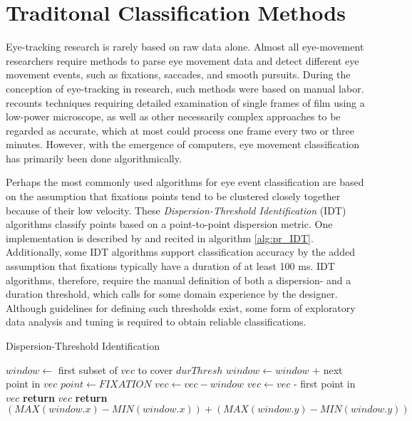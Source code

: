\section{Traditonal Classification Methods} \label{sec:pr_TraditionalClassificationMethods}

Eye-tracking research is rarely based on raw data alone. Almost all eye-movement researchers require methods to parse eye movement data and detect different eye movement events, such as fixations, saccades, and smooth pursuits. During the conception of eye-tracking in research, such methods were based on manual labor. \cite{hartridge1948} recounts techniques requiring detailed examination of single frames of film using a low-power microscope, as well as other necessarily complex approaches to be regarded as accurate, which at most could process one frame every two or three minutes. However, with the emergence of computers, eye movement classification has primarily been done algorithmically. 

Perhaps the most commonly used algorithms for eye event classification are based on the assumption that fixations points tend to be clustered closely together because of their low velocity. These \textit{Dispersion-Threshold Identification} (IDT) algorithms classify points based on a point-to-point dispersion metric. One implementation is described by \cite{salvucci2000} and recited in algorithm \ref{alg:pr_IDT}. Additionally, some IDT algorithms support classification accuracy by the added assumption that fixations typically have a duration of at least 100 ms. IDT algorithms, therefore, require the manual definition of both a dispersion- and a duration threshold, which calls for some domain experience by the designer. Although guidelines for defining such thresholds exist, some form of exploratory data analysis and tuning is required to obtain reliable classifications.

\begin{algorithm}
    \caption{Dispersion-Threshold Identification}
    \label{alg:pr_IDT}
    \begin{algorithmic}[1]
                \State $window \gets$ first subset of $vec$ to cover $durThresh$
                        \State $window \gets window $ + next point in $vec$
                    \EndWhile
                        \State $point \gets FIXATION$
                    \EndFor
                    \State $vec \gets vec - window$
                \Else
                    \State $vec \gets vec $ - first point in $vec$
                \EndIf
            \EndWhile
            \State \textbf{return} $vec$
        \EndProcedure
        \State
            \State \textbf{return} $(MAX(window.x) - MIN(window.x)) + (MAX(window.y) - MIN(window.y))$
        \EndProcedure
    \end{algorithmic}
\end{algorithm}

